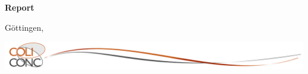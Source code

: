 \documentclass[12pt,        %
  english,ngerman,          %
  paper=a4,                 %
  captions=tablesignature,  %
  listof=numbered,          %
  bibliography=totoc,       %
  headings=small,           %
  headinclude=false,        %
  footinclude=false,        %
  parskip=half-,            %
  oneside,                  %
  DIV=12                    %
  ]{styles/colidok}
\begin{document}
\begin{titlepage}
\begin{center}
{  \Large
  \bfseries
  \textcolor{vzgblue}{
  Report \colireportlang \colireportno
  }
      
      \vspace{1.25cm}
      
      \huge
      \mdseries
        \colititle
    }

    \vfill

    {
      \normalsize

      \vfill
      \vfill
      
      Göttingen, \colidate
    }
      
      \vfill
      
    {

    \includegraphics[scale=0.3]{basics/coli-conc-wave.png}

    }
  \end{center}
\end{titlepage}


\clearpage
\setcounter{tocdepth}{1}

\tableofcontents

\mainmatter






\backmatter

  \cleardoublepage
  \listoffigures

  \cleardoublepage
  \listoftables
\end{document}
